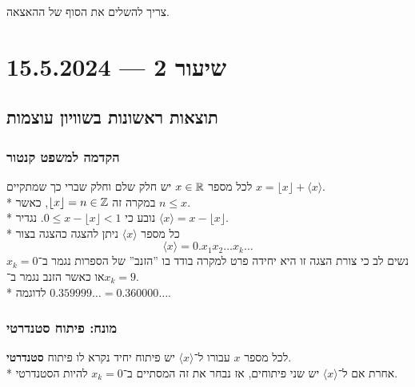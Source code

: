 צריך להשלים את הסוף של ההאצאה.

\section{שיעור 2 --- 15.5.2024}
\subsection{תוצאות ראשונות בשוויון עוצמות}
\subsubsection{הקדמה למשפט קנטור}
לכל מספר $x \in \mathbb{R}$ יש חלק שלם וחלק שברי כך שמתקיים $x = \lfloor x \rfloor + \langle x \rangle$. \\*
במקרה זה $\lfloor x \rfloor = n \in \mathbb{Z}$, כאשר $n \le x$. \\*
נובע כי $0 \le x - \lfloor x \rfloor < 1$. נגדיר $\langle x \rangle = x - \lfloor x \rfloor$. \\*
כל מספר $\langle x \rangle$ ניתן להצגה כהצגה בצור
\[
	\langle x \rangle = 0.x_1x_2 \hdots x_k \hdots
\]
נשים לב כי צורת הצגה זו היא יחידה פרט למקרה בודד בו ''הזנב'' של הספרות נגמר ב־$x_k = 0$ או כאשר הזנב נגמר ב־$x_k = 9$. \\*
לדוגמה $0.359999\hdots = 0.360000\hdots$.

\subsubsection{מונח: פיתוח סטנדרטי}
לכל מספר $x$ עבורו ל־$\langle x \rangle$ יש פיתוח יחיד נקרא לו פיתוח \textbf{סטנדרטי}. \\*
אחרת אם ל־$\langle x \rangle$ יש שני פיתוחים, אז נבחר את זה המסתיים ב־$x_k = 0$ להיות הסטנדרטי.

